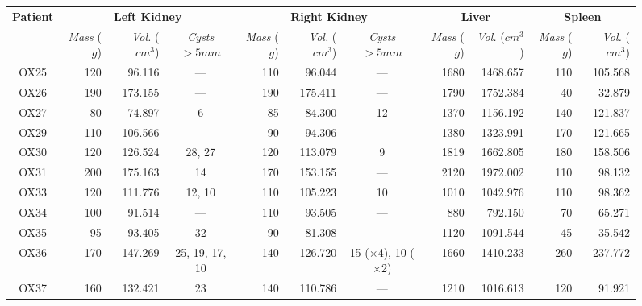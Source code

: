 \begin{landscape}
\begin{figure}[p]
\footnotesize
\begin{center}
\begin{tabular}{c|rrc|rrc|rr|rr}
\textbf{Patient} & \multicolumn{3}{|c|}{\textbf{Left Kidney}} & \multicolumn{3}{|c|}{\textbf{Right Kidney}} & \multicolumn{2}{|c|}{\textbf{Liver}} & \multicolumn{2}{|c}{\textbf{Spleen}} \\
& \emph{Mass} ($g$) & \emph{Vol.} ($\mathit{cm}^3$) & \emph{Cysts} $> 5\mathit{mm}$ & \emph{Mass} ($g$) & \emph{Vol.} ($\mathit{cm}^3$) & \emph{Cysts} $> 5\mathit{mm}$ & \emph{Mass} ($g$) & \emph{Vol.} ($\mathit{cm}^3$) & \emph{Mass} ($g$) & \emph{Vol.} ($\mathit{cm}^3$) \\
\hline
\hline
OX25 & 120 &  96.116 &            --- & 110 &  96.044 &                            --- & 1680 & 1468.657 & 110 & 105.568 \\
OX26 & 190 & 173.155 &            --- & 190 & 175.411 &                            --- & 1790 & 1752.384 &  40 &  32.879 \\
OX27 &  80 &  74.897 &              6 &  85 &  84.300 &                             12 & 1370 & 1156.192 & 140 & 121.837 \\
OX29 & 110 & 106.566 &            --- &  90 &  94.306 &                            --- & 1380 & 1323.991 & 170 & 121.665 \\
OX30 & 120 & 126.524 &         28, 27 & 120 & 113.079 &                              9 & 1819 & 1662.805 & 180 & 158.506 \\
OX31 & 200 & 175.163 &             14 & 170 & 153.155 &                            --- & 2120 & 1972.002 & 110 &  98.132 \\
OX33 & 120 & 111.776 &         12, 10 & 110 & 105.223 &                             10 & 1010 & 1042.976 & 110 &  98.362 \\
OX34 & 100 &  91.514 &            --- & 110 &  93.505 &                            --- &  880 &  792.150 &  70 &  65.271 \\
OX35 &  95 &  93.405 &             32 &  90 &  81.308 &                            --- & 1120 & 1091.544 &  45 &  35.542 \\
OX36 & 170 & 147.269 & 25, 19, 17, 10 & 140 & 126.720 & 15 ($\times$4), 10 ($\times$2) & 1660 & 1410.233 & 260 & 237.772 \\
OX37 & 160 & 132.421 &             23 & 140 & 110.786 &                            --- & 1210 & 1016.613 & 120 &  91.921 \\

\end{tabular}
\end{center}
\end{figure}
\end{landscape}
